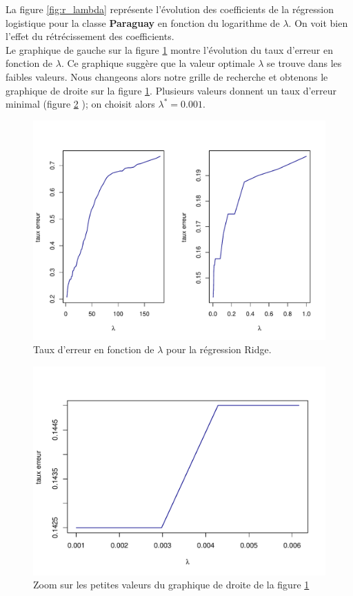 \documentclass[12pt,a4paper]{article}
\begin{document}
La figure \ref{fig:r_lambda} représente l'évolution des coefficients de la régression logistique pour la classe \textbf{Paraguay} en fonction du logarithme de $\lambda$. On voit bien l'effet du rétrécissement des coefficients.\\
Le graphique de gauche sur la figure \ref{fig:r_lopt} montre l'évolution du taux d'erreur en fonction de $\lambda$. Ce graphique suggère que la valeur optimale $\lambda$ se trouve dans les faibles valeurs. Nous changeons alors notre grille de recherche et obtenons le graphique de droite sur la figure \ref{fig:r_lopt}. Plusieurs valeurs donnent un taux d'erreur minimal (figure \ref{fig:zoom_r} ); on choisit alors $\lambda^* = 0.001$.\vspace{2mm}
\begin{figure}[h!]
	\begin{center}
		\includegraphics[scale=0.7]{figures/r_lopt.pdf}
		\caption{Taux d'erreur en fonction de $\lambda$ pour la régression Ridge.}
		\label{fig:r_lopt}
	\end{center}
\end{figure}
\begin{figure}[h!]
	\begin{center}
		\includegraphics[scale=0.5]{figures/zoom_r_lopt.pdf}
		\caption{Zoom sur les petites valeurs du graphique de droite de la figure \ref{fig:r_lopt}}
		\label{fig:zoom_r}
	\end{center}
\end{figure}
\end{document}

